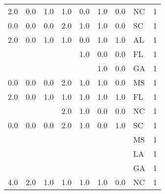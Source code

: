 \begin{tabular}{llllllllr}
2.0 & 0.0 & 1.0 & 1.0 & 0.0 & 1.0 & 0.0 & NC &     1 \\
0.0 & 0.0 & 0.0 & 2.0 & 1.0 & 1.0 & 0.0 & SC &     1 \\
2.0 & 0.0 & 1.0 & 1.0 & 0.0 & 1.0 & 1.0 & AL &     1 \\
    &     &     &     & 1.0 & 0.0 & 0.0 & FL &     1 \\
    &     &     &     &     & 1.0 & 0.0 & GA &     1 \\
0.0 & 0.0 & 0.0 & 2.0 & 1.0 & 1.0 & 0.0 & MS &     1 \\
2.0 & 0.0 & 1.0 & 1.0 & 1.0 & 1.0 & 1.0 & FL &     1 \\
    &     &     & 2.0 & 1.0 & 0.0 & 0.0 & NC &     1 \\
0.0 & 0.0 & 0.0 & 2.0 & 1.0 & 0.0 & 1.0 & SC &     1 \\
    &     &     &     &     &     &     & MS &     1 \\
    &     &     &     &     &     &     & LA &     1 \\
    &     &     &     &     &     &     & GA &     1 \\
4.0 & 2.0 & 1.0 & 1.0 & 1.0 & 1.0 & 0.0 & NC &     1 \\
\bottomrule
\end{tabular}

